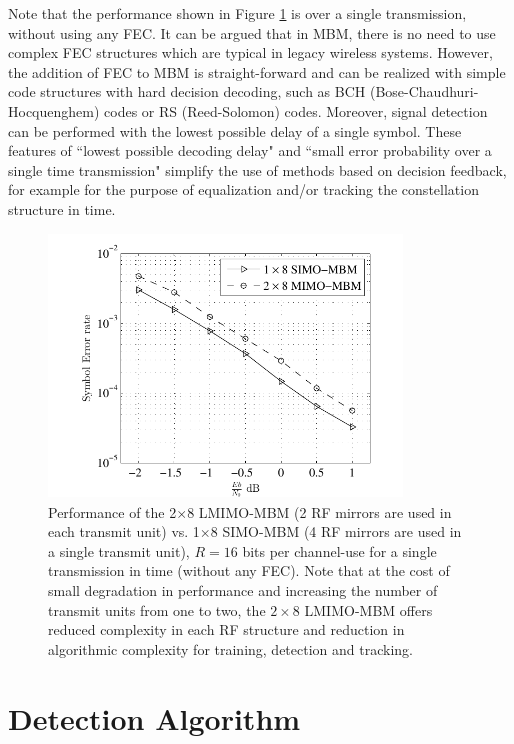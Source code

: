 Note that the performance shown in Figure \ref{MIMOvsSIMO} is over a single transmission, without using any FEC. It can be argued that in MBM, there is no need to use complex FEC structures which are typical in legacy wireless systems. However, the addition of FEC to MBM is straight-forward and can be realized with simple code structures with hard decision decoding, such as BCH (Bose-Chaudhuri-Hocquenghem) codes or RS (Reed-Solomon) codes. Moreover, signal detection can be performed with the lowest possible delay of a single symbol. These features of ``lowest possible decoding delay" and ``small error probability over a single time transmission" simplify the use of methods based on decision feedback, for example for the purpose of equalization and/or tracking the constellation structure in time.

\begin{figure}[t]
\centering
\hspace{1mm}
\includegraphics[width = 9.4cm, height = 7cm, trim = 6.5mm 0 -3mm 0 ]{./fig/MIMOvsSIMO2}
\caption{Performance of the 2$\times$8  LMIMO-MBM (2 RF mirrors are used in each transmit unit) vs. 1$\times$8 SIMO-MBM  (4 RF mirrors are used in a single transmit unit), $R = 16$ bits per channel-use for a single transmission in time (without any FEC). Note that at the cost of small degradation in performance and increasing the number of transmit units from one to two, the $2 \times 8$ LMIMO-MBM offers reduced complexity in each RF structure  and reduction in algorithmic complexity for training, detection and tracking.}
\label{MIMOvsSIMO}
\end{figure}


\section {Detection Algorithm}
\label{sec: Detection Algorithm}

